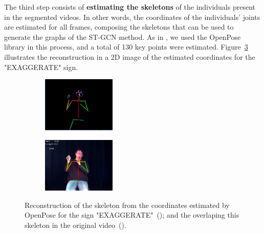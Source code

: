 
The third step consists of \textbf{estimating the skeletons} of the individuals present in the segmented videos. In other words, the coordinates of the individuals' joints are estimated for all frames, composing the skeletons that can be used to generate the graphs of the ST-GCN method. As in \cite {st-gcn-2018}, we used the OpenPose library in this process, and a total of 130 key points were estimated. Figure~\ref{fig:sign-pose} illustrates the reconstruction in a 2D image of the estimated coordinates for the "EXAGGERATE" sign.


\begin{figure}
    \centering
    \begin{subfigure}{3.5cm}
        \centering
        \includegraphics[width=3.5cm]{images/sign_pose}
        \caption{}
        \label{fig:sign-pose-skeleton}
    \end{subfigure}
    \begin{subfigure}{3.5cm}
      \centering
      \includegraphics[width=3.5cm]{images/sign_pose_blended}
      \caption{}
      \label{fig:sign-pose-blended}
    \end{subfigure}
    \caption{
        Reconstruction of the skeleton from the coordinates estimated by OpenPose for the sign "EXAGGERATE"~(); and the overlaping this skeleton in the original video~().
    }
    \label{fig:sign-pose}
\end{figure}

